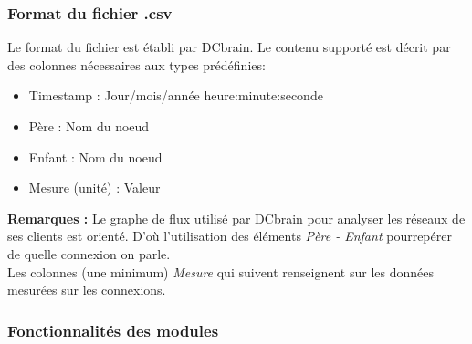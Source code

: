 			\subsubsection{Format du fichier .csv}
				Le format du fichier est établi par DCbrain. Le contenu supporté est décrit par des colonnes nécessaires aux types prédéfinies:\\
				\begin{itemize}
				\item Timestamp : Jour/mois/année	heure:minute:seconde
				\item Père : Nom du noeud
				\item Enfant : Nom du noeud
				\item Mesure (unité) : Valeur
				\end{itemize}
				\textbf{Remarques :} Le graphe de flux utilisé par DCbrain pour analyser les réseaux de ses clients est orienté. D'où l'utilisation des éléments \textit{Père - Enfant} pourrepérer de quelle connexion on parle.\\
				Les colonnes (une minimum) \textit{Mesure} qui suivent renseignent sur les données mesurées sur les connexions.
				
			\subsubsection{Fonctionnalités des modules}
			
